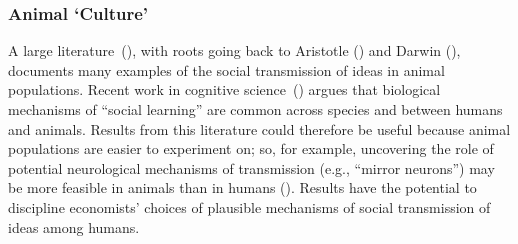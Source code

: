 


\subsubsection{Animal `Culture'}

A large literature~(\cite{whiten2021burgeoning}), with roots going back to Aristotle (\cite{laland2009animal}) and Darwin (\cite{heyes1996social}), documents many examples of the social transmission of ideas in animal populations.  Recent work in cognitive science~(\cite{kendal2018social}) argues that biological mechanisms of ``social learning'' are common across species and between humans and animals.  Results from this literature could therefore be useful because animal populations are easier to experiment on; so, for example, uncovering the role of potential neurological mechanisms of transmission (e.g., ``mirror neurons'') may be more feasible in animals than in humans (\cite{carcea2019biological}).  Results have the potential to discipline economists' choices of plausible mechanisms of social transmission of ideas among humans.
